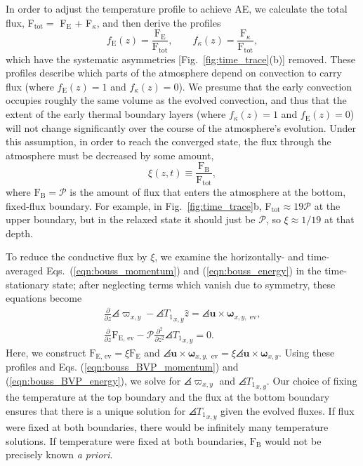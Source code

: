 In order to adjust the temperature profile to achieve AE, we calculate the total flux,
F$_{\text{tot}} =$ F$_{\text{E}}$ + F$_{\kappa}$, and then derive the profiles
\vspace{-0.5cm}
\begin{equation}
f_{\text{E}}(z) = \frac{\text{F}_{\text{E}}}{\text{F}_{\text{tot}}},\qquad
f_{\kappa}(z) = \frac{\text{F}_{\kappa}}{\text{F}_{\text{tot}}},
\label{eqn:bvp_ratios}
\end{equation}
which have the systematic asymmetries [Fig.~\ref{fig:time_trace}(b)] removed. These profiles describe which
parts of the atmosphere depend on convection to carry flux (where $f_{\text{E}}(z) = 1$
and $f_{\kappa}(z) = 0$).
We presume that the early convection occupies roughly the same volume as the evolved
convection, and thus that the extent of the early thermal boundary layers 
(where $f_{\kappa}(z) = 1$ and $f_{\text{E}}(z) = 0$) 
will not change significantly over the course of the atmosphere's evolution.
Under this assumption, in order to reach the converged state, 
the flux through the atmosphere must be decreased by some amount,
\vspace{-0.5cm}
\begin{equation}
\xi(z,t) \equiv \frac{\text{F}_{\text{B}}}{\text{F}_{\text{tot}}},
\label{eqn:xi}
\end{equation}
where $\text{F}_{\text{B}} = \mathcal{P}$ is the amount of flux that enters the
atmosphere at the bottom, fixed-flux boundary.
For example, in Fig.~\ref{fig:time_trace}b,
F$_{\text{tot}} \approx 19\mathcal{P}$ at the upper boundary,
but in the relaxed state 
it should just be $\mathcal{P}$, so $\xi \approx 1/19$ at that depth.

To reduce the conductive flux by $\xi$, we examine the 
horizontally- and time-averaged
Eqs.~(\ref{eqn:bouss_momentum}) and (\ref{eqn:bouss_energy}) in the time-stationary state; after 
neglecting terms which vanish due to symmetry, these equations become
\vspace{-0.2cm}
\begin{gather}
\frac{\partial}{\partial z}\angles{\varpi}_{x,y} - \angles{T_1}_{x,y}\hat{z} = \angles{\bm{u}\times\bm{\omega}}_{x,y, \text{ ev}},
	\label{eqn:bouss_BVP_momentum}
\\
\frac{\partial}{\partial z}\text{F}_{\text{E, ev}} - \mathcal{P}\frac{\partial^2}{\partial z^2} \angles{T_1}_{x,y} = 0.
	\label{eqn:bouss_BVP_energy}
\end{gather}
Here, we construct  $\text{F}_{\text{E, ev}} = \xi \text{F}_{\text{E}}$ 
and $\angles{\bm{u}\times\bm{\omega}}_{x, y,\text{ ev}}
= \xi\angles{\bm{u}\times\bm{\omega}}_{x, y}$.
Using these profiles and 
Eqs. (\ref{eqn:bouss_BVP_momentum}) and (\ref{eqn:bouss_BVP_energy}),
we solve for $\angles{\varpi}_{x,y}$ and $\angles{T_1}_{x,y}$.
Our choice of fixing the temperature at the top boundary and the flux at the bottom
boundary ensures that there is a unique solution for $\angles{T_1}_{x,y}$ given the evolved
fluxes. If flux were fixed at both boundaries, there would be infinitely many
temperature solutions. If temperature were fixed at both boundaries, 
$\text{F}_{\text{B}}$ would not be precisely known \emph{a priori}.

